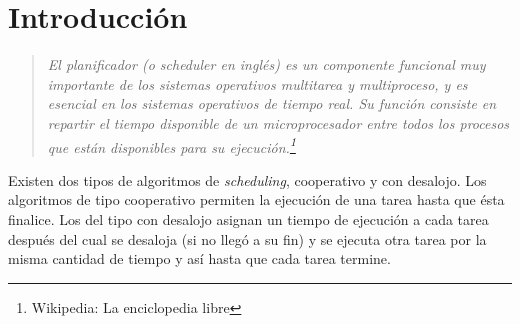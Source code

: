 \section{Introducción}

\begin{quote}

\textit{El planificador (o scheduler en inglés) es un componente funcional muy importante de los sistemas operativos multitarea y multiproceso, y es esencial en los sistemas operativos de tiempo real. Su función consiste en repartir el tiempo disponible de un microprocesador entre todos los procesos que están disponibles para su ejecución.\footnote{Wikipedia: La enciclopedia libre}}

\end{quote}

Existen dos tipos de algoritmos de \emph{scheduling}, cooperativo y con desalojo. Los algoritmos de tipo cooperativo permiten la ejecución de una tarea hasta que ésta finalice. Los del tipo con desalojo asignan un tiempo de ejecución a cada tarea después del cual se desaloja (si no llegó a su fin) y se ejecuta otra tarea por la misma cantidad de tiempo y así hasta que cada tarea termine. 



